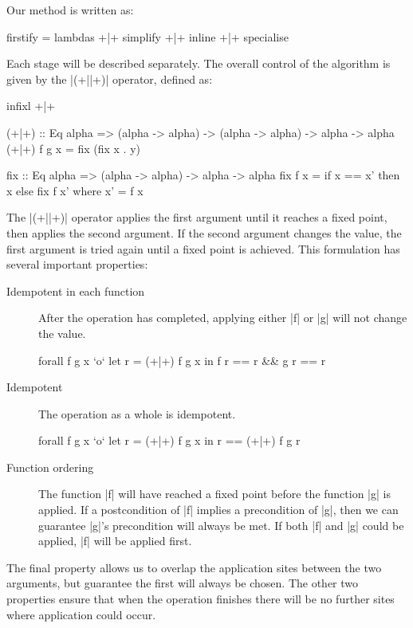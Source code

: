 \documentclass[preprint]{sigplanconf}
\begin{document}
Our method is written as:

\begin{code}
firstify = lambdas +|+ simplify +|+ inline +|+ specialise
\end{code}

Each stage will be described separately. The overall control of the algorithm is given by the |(+||+)| operator, defined as:

\begin{code}
infixl +|+

(+|+) :: Eq alpha => (alpha -> alpha) -> (alpha -> alpha) -> alpha -> alpha
(+|+) f g x  = fix (fix x . y)

fix :: Eq alpha => (alpha -> alpha) -> alpha -> alpha
fix f x = if x == x' then x else fix f x'
    where x' = f x
\end{code}

The |(+||+)| operator applies the first argument until it reaches a fixed point, then applies the second argument. If the second argument changes the value, the first argument is tried again until a fixed point is achieved. This formulation has several important properties:

\begin{description}
\item[Idempotent in each function] After the operation has completed, applying either |f| or |g| will not change the value.

\begin{code}
forall f g x `o` let r = (+|+) f g x in f r == r && g r == r
\end{code}

\item[Idempotent] The operation as a whole is idempotent.

\begin{code}
forall f g x `o` let r = (+|+) f g x in r == (+|+) f g r
\end{code}

\item[Function ordering] The function |f| will have reached a fixed point before the function |g| is applied. If a postcondition of |f| implies a precondition of |g|, then we can guarantee |g|'s precondition will always be met. If both |f| and |g| could be applied, |f| will be applied first.
\end{description}

The final property allows us to overlap the application sites between the two arguments, but guarantee the first will always be chosen. The other two properties ensure that when the operation finishes there will be no further sites where application could occur.
\end{document}
